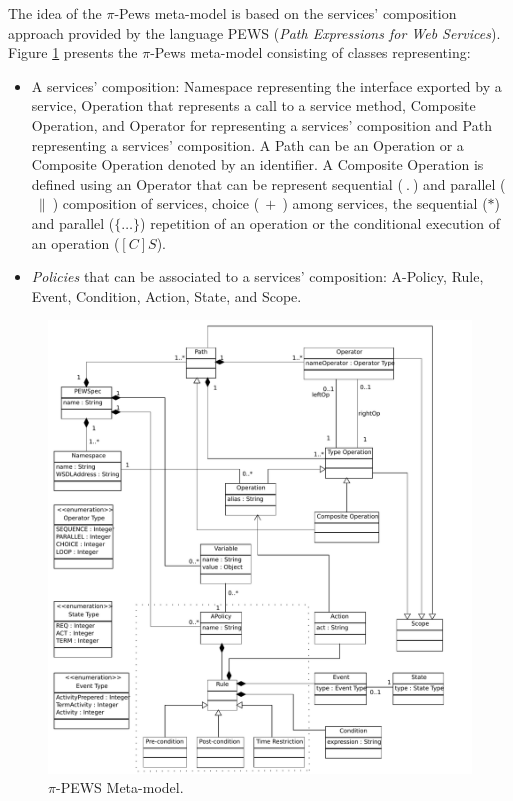 The idea of the $\pi$-{\sc Pews} meta-model is based on the services'
composition approach provided by the language PEWS
\cite{BHM06,Placido2010LTPD} (\textit{Path Expressions for Web Services}).
Figure \ref{fig:metamodel} presents the $\pi$-{\sc Pews} meta-model consisting of  classes representing:

\begin{itemize}
\item A services' composition: {\sc Namespace} representing the interface exported by a service, {\sc Operation} that represents a call to a service method, {\sc Composite Operation}, and  {\sc Operator} for representing a services' composition and {\sc Path} representing a services' composition.
A {\sc Path} can be an {\sc Operation} or a {\sc Composite Operation}
denoted by an identifier. A {\sc Composite Operation} is defined using an  {\sc Operator}  that can be represent  sequential ($\ . \ $) and parallel ($\ \| \ $) composition of services,
choice ($\ + \ $) among services,
the sequential ($*$) and parallel ($\{\dots\}$) repetition of an operation or the conditional execution of an operation ($[C]S$).

\item {\em Policies} that can be associated to a services' composition:  {\sc A-Policy}, {\sc Rule}, {\sc Event}, {\sc Condition}, {\sc Action}, {\sc State}, and {\sc Scope}.
\end{itemize}
 
\begin{figure}[ht!]
\centering
\includegraphics[width=1.0\textwidth]{chapters/methodology/figs/PEWSMetamodel}
\caption{$\pi$-PEWS Meta-model.}
\label{fig:metamodel}
\end{figure}

